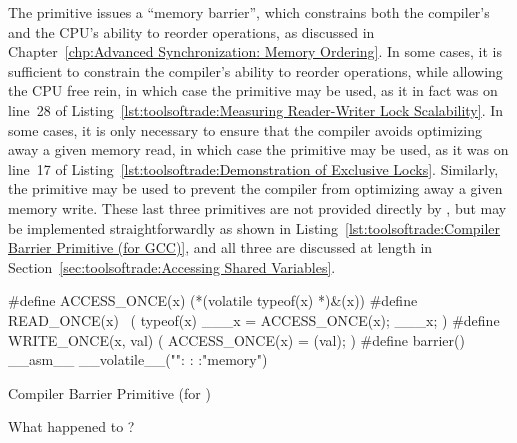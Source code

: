 The  primitive issues a ``memory barrier'',
which constrains both the compiler's and the CPU's ability to reorder
operations, as discussed in
Chapter~\ref{chp:Advanced Synchronization: Memory Ordering}.
In some cases, it is sufficient to constrain the compiler's ability
to reorder operations, while allowing the CPU free rein, in which
case the  primitive may be used, as it in fact was
on line~28 of
Listing~\ref{lst:toolsoftrade:Measuring Reader-Writer Lock Scalability}.
In some cases, it is only necessary to ensure that the compiler
avoids optimizing away a given memory read, in which case the
 primitive may be used, as it was on line~17 of
Listing~\ref{lst:toolsoftrade:Demonstration of Exclusive Locks}.
Similarly, the  primitive may be used to prevent the
compiler from optimizing away a given memory write.
These last three primitives are not provided directly by \GCC,
but may be implemented straightforwardly as shown in
Listing~\ref{lst:toolsoftrade:Compiler Barrier Primitive (for GCC)},
and all three are discussed at length in
Section~\ref{sec:toolsoftrade:Accessing Shared Variables}.

\begin{listing}[tb]
{ \scriptsize
\begin{verbbox}
#define ACCESS_ONCE(x) (*(volatile typeof(x) *)&(x))
#define READ_ONCE(x) \
            ({ typeof(x) ___x = ACCESS_ONCE(x); ___x; })
#define WRITE_ONCE(x, val) ({ ACCESS_ONCE(x) = (val); })
#define barrier() __asm__ __volatile__("": : :"memory")
\end{verbbox}
}
\centering
\theverbbox
\caption{Compiler Barrier Primitive (for \GCC)}
\label{lst:toolsoftrade:Compiler Barrier Primitive (for GCC)}
\end{listing}

\QuickQuiz{}
	What happened to ?
 \QuickQuizEnd

